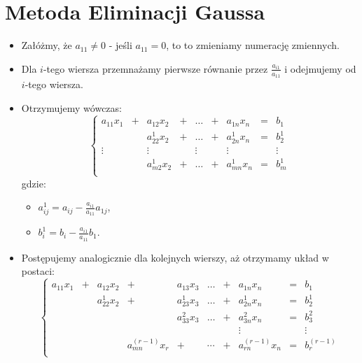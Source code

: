 \documentclass{article}
\begin{document}
\section{Metoda Eliminacji Gaussa}
\begin{itemize}
    \item Załóżmy, że $a_{11} \neq 0$ - jeśli $a_{11} = 0$, to
        to zmieniamy numerację zmiennych.
    \item Dla $i$-tego wiersza przemnażamy pierwsze równanie przez
        $\frac{a_{i1}}{a_{11}}$ i odejmujemy od $i$-tego wiersza.
    \item Otrzymujemy wówczas:
    $$
        \left\{
        \begin{array}{ccccccccc}
            a_{11}x_{1} &   +   &   a_{12}x_{2}     &   +   &   \dots   &   +   &   a_{1n}x_{n}     &   =   &   b_{1}\\
                        &       &   a_{22}^{1}x_{2} &   +   &   \dots   &   +   &   a_{2n}^{1}x_{n} &   =   &   b_{2}^{1}\\
            \vdots      &       &   \vdots          &       &   \vdots  &       &   \vdots          &       &   \vdots\\
                        &       &   a_{m2}^{1}x_{2} &   +   &   \dots   &   +   &   a_{mn}^{1}x_{n} &   =   &   b_{m}^{1}\\
        \end{array}
        \right.
    $$
    gdzie:
    \begin{itemize}
        \item $a_{ij}^{1} = a_{ij} - \frac{a_{i1}}{a_{11}}a_{1j}$,
        \item $b_{i}^{1} = b_{i} - \frac{a_{i1}}{a_{11}}b_{1}$.
    \end{itemize}
    \item Postępujemy analogicznie dla kolejnych wierszy,
        aż otrzymamy układ w postaci:
    $$
        \left\{
        \begin{array}{cccccccccc}
            a_{11}x_{1} &   +   &   a_{12}x_{2}     &   +   &   a_{13}x_{3}     &   \dots   &   +   &   a_{1n}x_{n}         &   =   &   b_{1}\\
                        &       &   a_{22}^{1}x_{2} &   +   &   a_{23}^{1}x_{3} &   \dots   &   +   &   a_{2n}^{1}x_{n}     &   =   &   b_{2}^{1}\\
                        &       &                   &       &   a_{33}^{2}x_{3} &   \dots   &   +   &   a_{3n}^{2}x_{n}     &   =   &   b_{3}^{2}\\
                        &       &                   &       &                   &           &       &   \vdots              &       &   \vdots\\
                            &           &       &   a_{mn}^{(r-1)}x_{r}     &   +   & \cdots &  +   &   a_{rn}^{(r-1)}x_{n} &   =   &   b_{r}^{(r-1)}\\
        \end{array}
        \right.
    $$
\end{itemize}
\end{document}
